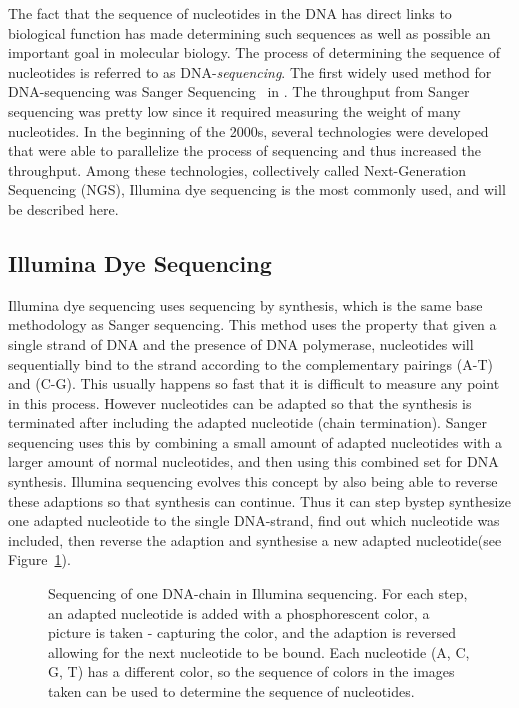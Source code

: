 The fact that the sequence of nucleotides in the DNA has direct links to biological function has made determining such sequences as well as possible an important goal in molecular biology.
The process of determining the sequence of nucleotides is referred to as DNA-\emph{sequencing}.
The first widely used method for DNA-sequencing was Sanger Sequencing~\cite{sanger} in .
The throughput from Sanger sequencing was pretty low since it required measuring the weight of many nucleotides. 
In the beginning of the 2000s, several technologies were developed that were able to parallelize the process of sequencing and thus increased the throughput. Among these technologies,  collectively called Next-Generation Sequencing (NGS), Illumina dye sequencing is the most commonly used, and will be described here.

\subsection{Illumina Dye Sequencing}
Illumina dye sequencing uses sequencing by synthesis, which is the same base methodology as Sanger sequencing. 
This method uses the property that given a single strand of DNA and the presence of DNA polymerase, nucleotides will sequentially bind to the strand according to the complementary pairings (A-T) and (C-G).
This usually happens so fast that it is difficult to measure any point in this process.
However nucleotides can be adapted so that the synthesis is terminated after including the adapted nucleotide (chain termination).
Sanger sequencing uses this by combining a small amount of adapted nucleotides with a larger amount of normal nucleotides, and then using this combined set for DNA synthesis.
Illumina sequencing evolves this concept by also being able to reverse these adaptions so that synthesis can continue. Thus it can step bystep synthesize one adapted nucleotide to the single DNA-strand, find out which nucleotide was included, then reverse the adaption and synthesise a new adapted nucleotide(see Figure~\ref{fig:illumina}).
\begin{figure}
  \tikzpicture
  
  \endtikzpicture
  \caption{Sequencing of one DNA-chain in Illumina sequencing. For each step, an adapted nucleotide is added with a phosphorescent color, a picture is taken - capturing the color, and the adaption is reversed allowing for the next nucleotide to be bound. Each nucleotide (A, C, G, T) has a different color, so the sequence of colors in the images taken can be used to determine the sequence of nucleotides.}
  \label{fig:illumina}
\end{figure}

